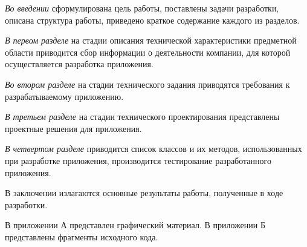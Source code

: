 \emph{Во введении} сформулирована цель работы, поставлены задачи разработки, описана структура работы, приведено краткое содержание каждого из разделов.

\emph{В первом разделе} на стадии описания технической характеристики предметной области приводится сбор информации о деятельности компании, для которой осуществляется разработка приложения.

\emph{Во втором разделе} на стадии технического задания приводятся требования к разрабатываемому приложению.

\emph{В третьем разделе} на стадии технического проектирования представлены проектные решения для приложения.

\emph{В четвертом разделе} приводится список классов и их методов, использованных при разработке приложения, производится тестирование разработанного приложения.

В заключении излагаются основные результаты работы, полученные в ходе разработки.

В приложении А представлен графический материал.
В приложении Б представлены фрагменты исходного кода. 
